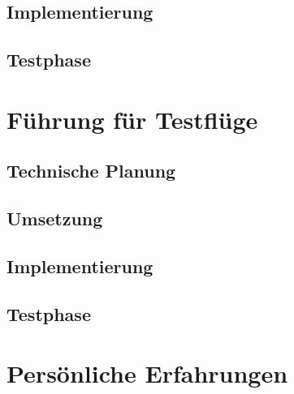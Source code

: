 	\subsection{Implementierung}

	\subsection{Testphase}

\section{Führung für Testflüge}

	\subsection{Technische Planung}

	\subsection{Umsetzung}

	\subsection{Implementierung}

	\subsection{Testphase}

\section{Persönliche Erfahrungen}